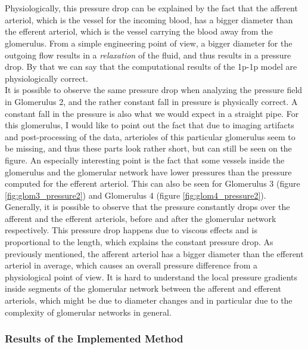\\
\\Physiologically, this pressure drop can be explained by the fact that the afferent arteriol, which is the vessel for the incoming blood, has a bigger diameter than the efferent arteriol, which is the vessel carrying the blood away from the glomerulus. From a simple engineering point of view, a bigger diameter for the outgoing flow results in a \emph{relaxation} of the fluid, and thus results in a pressure drop. By that we can say that the computational results of the 1p-1p model are physiologically correct.
\\It is possible to observe the same pressure drop when analyzing the pressure field in Glomerulus 2, and the rather constant fall in pressure is physically correct. A constant fall in the pressure is also what we would expect in a straight pipe. For this glomerulus, I would like to point out the fact that due to imaging artifacts and post-processing of the data, arterioles of this particular glomerulus seem to be missing, and thus these parts look rather short, but can still be seen on the figure. An especially interesting point is the fact that some vessels inside the glomerulus and the glomerular network have lower pressures than the pressure computed for the efferent arteriol. This can also be seen for Glomerulus 3 (figure \ref{fig:glom3_pressure2}) and Glomerulus 4 (figure \ref{fig:glom4_pressure2}).
\\Generally, it is possible to observe that the pressure constantly drops over the afferent and the efferent arteriols, before and after the glomerular network respectively. This pressure drop happens due to viscous effects and is proportional to the length, which explains the constant pressure drop. As previously mentioned, the afferent arteriol has a bigger diameter than the efferent arteriol in average, which causes an overall pressure difference from a physiological point of view. It is hard to understand the local pressure gradients inside segments of the glomerular network between the afferent and efferent arteriols, which might be due to diameter changes and in particular due to the complexity of glomerular networks in general.
\\

\subsubsection*{Results of the Implemented Method}
\label{ResultsImplMeth}

